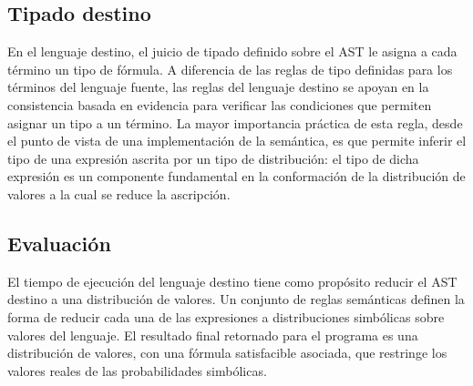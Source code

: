 \subsection{Tipado destino}

 En el lenguaje destino, el juicio de tipado definido
  sobre el AST le asigna a cada término un tipo de fórmula. A
  diferencia de las reglas de tipo definidas para los términos del
  lenguaje fuente, las reglas del lenguaje destino se apoyan en la
  consistencia basada en evidencia para verificar las condiciones que
  permiten asignar un tipo a un término. La mayor importancia práctica
  de esta regla, desde el punto de vista de una implementación de la
  semántica, es que permite inferir el tipo de una expresión ascrita
  por un tipo de distribución: el tipo de dicha expresión es un
  componente fundamental en la conformación de la distribución de
  valores a la cual se reduce la ascripción.



\subsection{Evaluación} El tiempo de ejecución del lenguaje destino tiene como propósito reducir el AST destino a una distribución de valores. Un conjunto de reglas semánticas definen la forma de reducir cada una de las expresiones a distribuciones simbólicas sobre valores del lenguaje. El resultado final retornado para el programa es una distribución de valores, con una fórmula satisfacible asociada, que restringe los valores reales de las probabilidades simbólicas.




